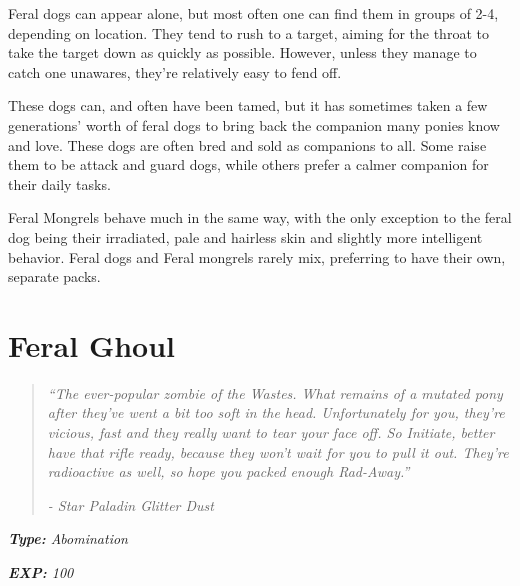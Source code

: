 \documentclass[11pt,a4paper,twocolumn]{book}
\begin{document}
	\bigskip
	Feral dogs can appear alone, but most often one can find them in groups of 2-4, depending on location. They tend to rush to a target, aiming for the throat to take the target down as quickly as possible. However, unless they manage to catch one unawares, they're relatively easy to fend off.
	
	These dogs can, and often have been tamed, but it has sometimes taken a few generations' worth of feral dogs to bring back the companion many ponies know and love. These dogs are often bred and sold as companions to all. Some raise them to be attack and guard dogs, while others prefer a calmer companion for their daily tasks. 
	
	\bigskip
	Feral Mongrels behave much in the same way, with the only exception to the feral dog being their irradiated, pale and hairless skin and slightly more intelligent behavior. Feral dogs and Feral mongrels rarely mix, preferring to have their own, separate packs.
	
	\clearpage
	
	\section*{Feral Ghoul}
	\begin{quote}
		\emph{``The ever-popular zombie of the Wastes. What remains of a mutated pony after they've went a bit too soft in the head. Unfortunately for you, they're vicious, fast and they really want to tear your face off. So Initiate, better have that rifle ready, because they won't wait for you to pull it out. They're radioactive as well, so hope you packed enough Rad-Away.''}
		
		\emph{-	Star Paladin Glitter Dust}
	\end{quote}
	
	\noindent
	\emph{\textbf{Type:} Abomination}
	
	\noindent
	\emph{\textbf{EXP:} 100}
	
\end{document}
